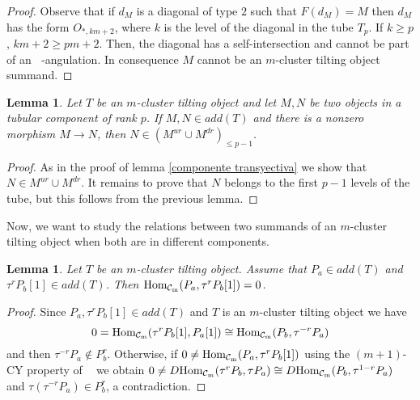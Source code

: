\documentclass{amsart}
\theoremstyle{plain}
\newtheorem{lema}[teo]{Lemma}
\theoremstyle{definition}
\begin{document}
\begin{proof}
Observe that if $d_M$ is a  diagonal of type $2$ such that $F(d_M)=M$ then  $d_M$ has the form $O_{*,km+2}$,  where $k$ is the level of the  diagonal in the tube  $T_p$. If $k\geq p$, $km+2\geq pm+2$.   Then, the diagonal has a self-intersection and cannot be part of an  ${\mathop{(m+2)}\nolimits}$-angulation. In consequence $M$ cannot be  an  $m$-cluster tilting object summand.
\end{proof}

\begin{lema}\label{sumandos de T en un tubo}
Let $T$ be  an  $m$-cluster tilting object  and let   $M,N$ be two  objects in a  tubular component of rank $p$. If $M,N\in add(T)$ and there is a nonzero  morphism  $M\rightarrow N$, then  $N\in (M^{ur} \cup M^{dr})_{\leq p-1}$.

\end{lema}

\begin{proof}
   As in the proof of lemma \ref{componente transyectiva} we show that $N\in M^{ur} \cup M^{dr}$. It remains to prove that $N$ belongs to the first  $p-1$ levels of the  tube, but this follows from the previous lemma.
\end{proof}

Now, we want to study the  relations  between two summands of an $m$-cluster tilting object  when both are in different components.\\

\begin{lema}\label{morfismos entre P' y algun tau de P[1]}
Let $T$ be  an  $m$-cluster tilting object. Assume that  $P_a \in add(T)$ and $\tau^rP_b[1]\in add(T)$. Then ${\mathop{\rm Hom_{\mathcal{C}_m}}\nolimits}(P_a,\tau^rP_b[1])=0$.
\end{lema}

\begin{proof}
Since  $P_a, \tau^rP_b[1] \in add(T)$ and $T$ is an  $m$-cluster tilting object we have
$$0={\mathop{\rm Hom_{\mathcal{C}_m}}\nolimits}(\tau^rP_b[1],P_a[1])\cong
{\mathop{\rm Hom_{\mathcal{C}_m}}\nolimits}(P_b,\tau^{-r}P_a)$$
 and then $\tau^{-r}P_a \notin P_b^r$. Otherwise,  if  $0\neq {\mathop{\rm Hom_{\mathcal{C}_m}}\nolimits}(P_a,\tau^rP_b[1])$ using the  $(m+1)$-CY  property of ${\mathop{\mathcal{C}_m}\nolimits}$ we obtain  $0\neq D{\mathop{\rm Hom_{\mathcal{C}_m}}\nolimits}(\tau^rP_b, \tau P_a)\cong D{\mathop{\rm Hom_{\mathcal{C}_m}}\nolimits}(P_b,\tau^{1-r}P_a)$ and $\tau(\tau^{-r}P_a) \in P_b^r$, a contradiction.
\end{proof}
\end{document}
